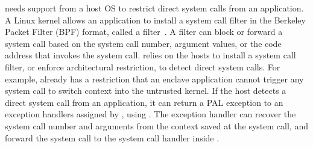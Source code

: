 \thelibos{} needs support from a host OS to restrict direct system calls from an application.
A Linux kernel allows an application to install a system call filter in the Berkeley Packet Filter (BPF) format,
called a \seccomp{} filter~\cite{seccomp}.
A \seccomp{} filter can block or forward a system call based on the system call number,
argument values, or the code address that invokes the system call.
\graphene{} relies on the hosts to install a system call filter, or enforce architectural restriction, to detect direct system calls.
For example, \sgx{} already has a restriction that an enclave application cannot trigger any system call to switch context into the untrusted kernel.
If the host detects a direct system call from an application,
it can return
a PAL exception to an exception handlers assigned by \thelibos{}, using  .
The exception handler can recover the system call number and arguments
from the context saved at the system call,
and forward the system call to the system call handler
inside \thelibos{}.


